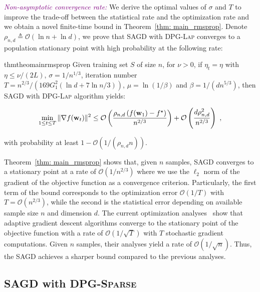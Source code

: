 \documentclass[11pt]{article}
\begin{document}
\textcolor{purple}{\textit{Non-asymptotic convergence rate:}}
We derive the optimal values of $\sigma$ and $T$ to improve the trade-off between the statistical rate and the optimization rate and we obtain a novel finite-time bound in Theorem~\ref{thm: main_rmsprop}. 
Denote $\rho_{n,d} \triangleq\mathcal{O} \left(\ln n + \ln d\right)$, we prove that \textsc{SAGD} with \textsc{DPG-Lap} converges to a population stationary point with high probability at the following rate:

\begin{restatable}{thm}{theomainrmsprop}
\label{thm: main_rmsprop}
 Given training set $S$ of size $n$, for $\nu >0$, if $\eta_t = \eta$  with $\eta \leq \nu/(2L)$,  $\sigma = 1/n^{1/3}$, iteration number $T = n^{2/3}/\left(169G_1^2(\ln d +7\ln n/3)\right)$, $\mu = \ln (1/\beta)$ and $\beta = 1/(d n^{5/3})$, then \textsc{SAGD} with \textsc{DPG-Lap} algorithm yields:
 \begin{small}
\begin{equation*}
 \min_{1\leq t \leq T}\|\nabla f(\mathbf{w}_t)\|^2 \leq
\mathcal{O} \left( \frac{\rho_{n,d} \left(f(\mathbf{w}_1) - f^\star \right)}{n^{2/3}} \right) + \mathcal{O} \left( \frac{d \rho_{n,d}^2}{n^{2/3}}\right)~,
\end{equation*}
\end{small}
with probability at least $1-\mathcal{O} \left(1/(\rho_{n,d} n)\right)$.
\end{restatable} 
Theorem~\ref{thm: main_rmsprop} shows that, given $n$ samples, \textsc{SAGD} converges to a stationary point at a rate of $\mathcal{O}(1/n^{2/3})$ where we use the $\ell_2$ norm of the gradient of the objective function as a convergence criterion.
Particularly, the first term of the bound corresponds to the optimization error $\mathcal{O}(1/T)$ with $T = \mathcal{O}(n^{2/3})$, while the second is the statistical error depending on available sample size $n$ and dimension $d$. 
The current optimization analyses~\citep{zare18, wawu19, zosh2019, cheli2019} show that adaptive gradient descent algorithms converge to the stationary point of the objective function with a rate of $\mathcal{O}(1/\sqrt{T})$ with $T$ stochastic gradient computations. 
Given $n$ samples, their analyses yield a rate of  $\mathcal{O}(1/\sqrt{n})$. 
Thus, the \textsc{SAGD} achieves a sharper bound compared to the previous analyses. 

\subsection{\textsc{SAGD} with \textsc{DPG-Sparse}} \label{subsec: SAGD-sparse}
\end{document}
